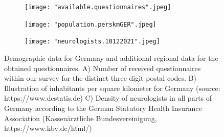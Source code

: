 \documentclass{bmcart}
\begin{document}
\begin{figure}
    \centering
    \begin{subfigure}[b]{0.35\linewidth}
        \texttt{[image: "available.questionnaires".jpeg]}
        \label{fig1:questionnaires}
    \end{subfigure}%
    \begin{subfigure}[b]{0.35\linewidth}
        \texttt{[image: "population.perskmGER".jpeg]}
        \label{fig1:population}
    \end{subfigure}%
    \begin{subfigure}[b]{0.35\linewidth}
        \texttt{[image: "neurologists.10122021".jpeg]}
        \label{fig1:neurologists}
    \end{subfigure}%
\caption{Demographic data for Germany and additional regional data for the obtained questionnaires. A) Number of received questionnaires within our survey for the distinct three digit postal codes. B) Illustration of inhabitants per square kilometer for Germany (source: https://www.destatis.de) C) Density of neurologists in all parts of Germany according to the German Statutory Health Insurance Association (Kassenärztliche Bundesvereinigung, https://www.kbv.de/html/)}
\label{fig1:total}
\end{figure}
\end{document}
